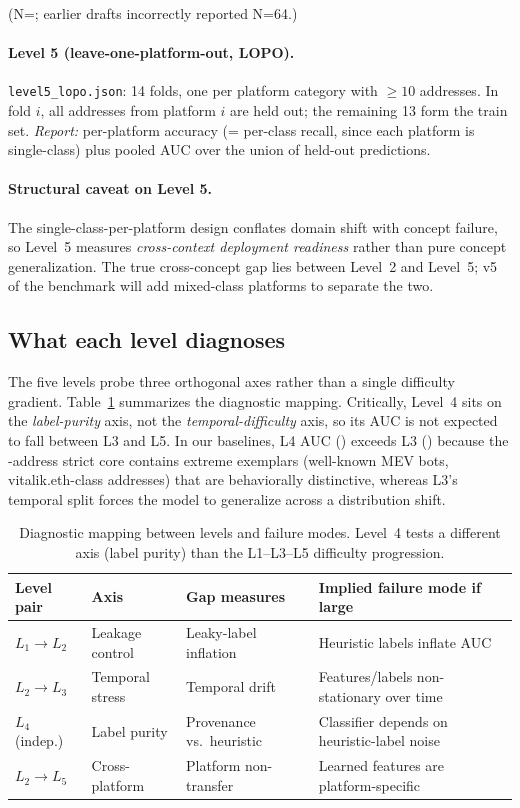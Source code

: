 \documentclass[10pt]{article}
\begin{document}
(N=\datasetStrictCoreN{}; earlier drafts incorrectly reported N=64.)

\paragraph{Level 5 (leave-one-platform-out, LOPO).} \texttt{level5\_lopo.json}: 14 folds, one per platform category with $\geq 10$ addresses. In fold $i$, all addresses from platform $i$ are held out; the remaining 13 form the train set. \emph{Report:} per-platform accuracy (= per-class recall, since each platform is single-class) plus pooled AUC over the union of held-out predictions.

\paragraph{Structural caveat on Level 5.} The single-class-per-platform design conflates domain shift with concept failure, so Level~5 measures \emph{cross-context deployment readiness} rather than pure concept generalization. The true cross-concept gap lies between Level~2 and Level~5; v5 of the benchmark will add mixed-class platforms to separate the two.

\subsection{What each level diagnoses}

The five levels probe three orthogonal axes rather than a single difficulty gradient. Table~\ref{tab:diagnostic} summarizes the diagnostic mapping. Critically, Level~4 sits on the \emph{label-purity} axis, not the \emph{temporal-difficulty} axis, so its AUC is not expected to fall between L3 and L5. In our baselines, L4 AUC (\cascadeLevelStrictCoreAuc{}) exceeds L3 (\temporalHoldoutRfAuc{}) because the \datasetStrictCoreN{}-address strict core contains extreme exemplars (well-known MEV bots, vitalik.eth-class addresses) that are behaviorally distinctive, whereas L3's temporal split forces the model to generalize across a distribution shift.

\begin{table}[h]
\centering
\small
\caption{Diagnostic mapping between levels and failure modes. Level~4 tests a different axis (label purity) than the L1--L3--L5 difficulty progression.}
\label{tab:diagnostic}
\begin{tabular}{llll}
\toprule
Level pair & Axis & Gap measures & Implied failure mode if large \\
\midrule
$L_1 \to L_2$ & Leakage control & Leaky-label inflation & Heuristic labels inflate AUC \\
$L_2 \to L_3$ & Temporal stress & Temporal drift & Features/labels non-stationary over time \\
$L_4$ (indep.) & Label purity & Provenance vs.\ heuristic & Classifier depends on heuristic-label noise \\
$L_2 \to L_5$ & Cross-platform & Platform non-transfer & Learned features are platform-specific \\
\bottomrule
\end{tabular}
\end{table}
\end{document}

